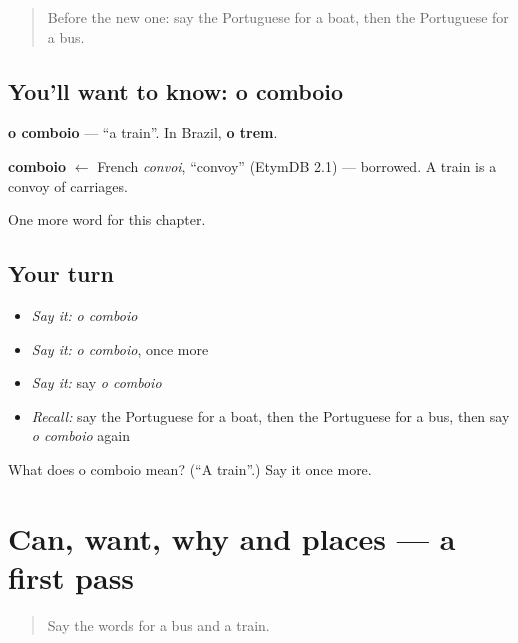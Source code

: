 \begin{quote}
Before the new one: say the Portuguese for a boat, then the Portuguese for a bus.
\end{quote}

\subsection*{You'll want to know: o comboio}
\textbf{o comboio} — \textquotedblleft{}a train\textquotedblright{}. In Brazil, \textbf{o trem}.

\begin{cousinweb}
\textbf{comboio} $\leftarrow$ French \emph{convoi}, \textquotedblleft{}convoy\textquotedblright{} (EtymDB 2.1) — borrowed. A train is a convoy of carriages.
\end{cousinweb}

\begin{grammarlens}[title={What you've built}]
One more word for this chapter.
\end{grammarlens}

\subsection*{Your turn}
\begin{itemize}
\raggedright
  \item \emph{Say it:} \emph{o comboio}
  \item \emph{Say it:} \emph{o comboio}, once more
  \item \emph{Say it:} say \emph{o comboio}
  \item \emph{Recall:} say the Portuguese for a boat, then the Portuguese for a bus, then say \emph{o comboio} again
\end{itemize}

\begin{tcolorbox}[breakable,colback=teal!4,colframe=teal!35!black,title={Before you move on}]
What does o comboio mean? (\textquotedblleft{}A train\textquotedblright{}.) Say it once more.
\end{tcolorbox}
\section[(dialogue)]{Can, want, why and places — a first pass}

\label{lesson:PT-R92-first-pass-can-want-why-and-places}



\begin{quote}
Say the words for a bus and a train.
\end{quote}

